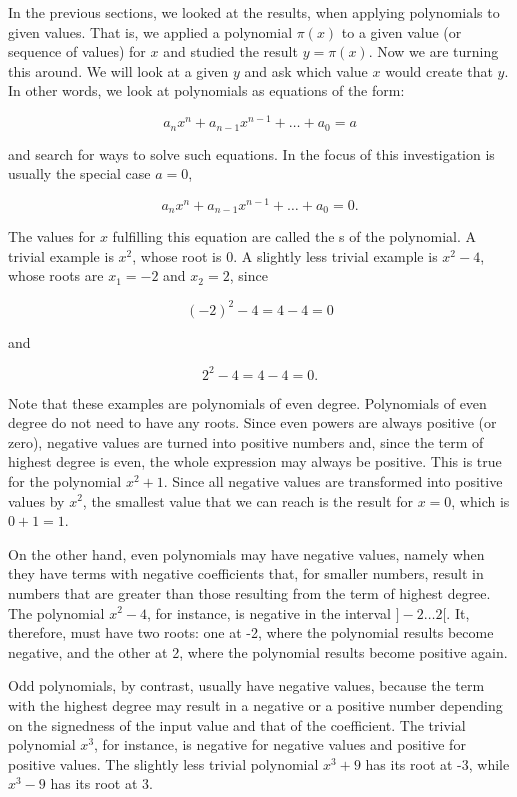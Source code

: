 \documentclass[tikz]{scrreprt}
\begin{document}
In the previous sections, we looked at the results,
when applying polynomials to given values.
That is, we applied a polynomial $\pi(x)$ to
a given value (or sequence of values) for $x$ 
and studied the result $y = \pi(x)$.
Now we are turning this around. We will look at
a given $y$ and ask which value $x$ would
create that $y$. In other words, 
we look at polynomials as equations of the form:

\begin{equation}
a_nx^n + a_{n-1}x^{n-1} + \dots + a_0 = a
\end{equation}

and search for ways to solve such equations.
In the focus of this investigation is usually
the special case $a=0$, \ie\:

\begin{equation}
a_nx^n + a_{n-1}x^{n-1} + \dots + a_0 = 0.
\end{equation}

The values for $x$ fulfilling this equation
are called the s of the polynomial.
A trivial example is $x^2$, whose root is 0.
A slightly less trivial example is $x^2 - 4$,
whose roots are $x_1 = -2$ and $x_2 = 2$, since

\[
(-2)^2 - 4 = 4 - 4 = 0
\]

and

\[
2^2 - 4 = 4 - 4 = 0.
\]

Note that these examples are polynomials of even degree.
Polynomials of even degree do not need to have any roots.
Since even powers are always positive (or zero), negative values
are turned into positive numbers and, since the term of highest
degree is even, the whole expression may always be positive.
This is true for the polynomial $x^2 + 1$. Since all negative values
are transformed into positive values by $x^2$, the smallest value
that we can reach is the result for $x=0$, which is $0+1=1$.

On the other hand, even polynomials may have negative values,
namely when they have terms with negative coefficients that, 
for smaller numbers,
result in numbers that are greater than those resulting from
the term of highest degree. 
The polynomial $x^2 - 4$, for instance, is negative
in the interval $]-2\dots 2[$. It, therefore, must have two roots:
one at -2, where the polynomial results become negative, and the other at 2,
where the polynomial results become positive again.

Odd polynomials, by contrast, usually have negative values, because
the term with the highest degree may result in a negative or a
positive number depending on the signedness of the input value
and that of the coefficient.
The trivial polynomial $x^3$, for instance, is negative for
negative values and positive for positive values. The slightly
less trivial polynomial $x^3 + 9$ has its root at -3, while
$x^3 - 9$ has its root at 3.
\end{document}

